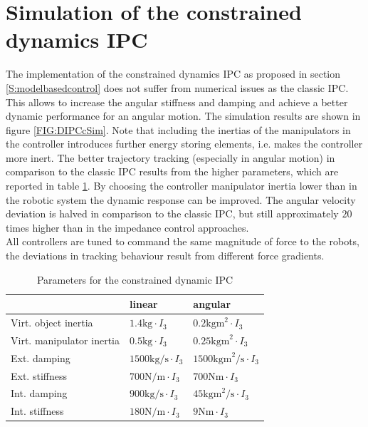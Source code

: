 \documentclass[a4paper,twoside, openright,12pt]{report}
\begin{document}
{\section{Simulation of the constrained dynamics IPC}
The implementation of the constrained dynamics IPC as proposed in section \ref{S:modelbasedcontrol} does not suffer from numerical issues as the classic IPC. This allows to increase the angular stiffness and damping and achieve a better dynamic performance for an angular motion. The simulation results are shown in figure \ref{FIG:DIPCcSim}. Note that including the inertias of the manipulators in the controller introduces further energy storing elements, i.e. makes the controller more inert. The better trajectory tracking (especially in angular motion) in comparison to the classic IPC results from the higher parameters, which are reported in table \ref{TAB:DIPCcParameters}. By choosing the controller manipulator inertia lower than in the robotic system the dynamic response can be improved. The angular velocity deviation is halved in comparison to the classic IPC, but still approximately $20$ times higher than in the impedance control approaches.\\
All controllers are tuned to command the same magnitude of force to the robots, the deviations in tracking behaviour result from different force gradients.
\begin{table}
	\centering
	\caption[Parameters for the constrained dynamic IPC]{Parameters for the constrained dynamic IPC}\vspace{10pt}
	\label{TAB:DIPCcParameters}
	
	\begin{tabular}{ l | l | l }
	 & linear & angular \\ \hline
	Virt. object inertia & $1.4 \text{kg} \cdot I_3$ & $0.2 \text{kgm}^2 \cdot I_3$ \\ \hline
	Virt. manipulator inertia & $0.5 \text{kg} \cdot I_3$ & $0.25 \text{kgm}^2 \cdot I_3$ \\ \hline 
	Ext. damping	 & $1500 \text{kg/s} \cdot I_3$ & $1500 \text{kgm}^2 \text{/s} \cdot I_3$ \\ \hline
	Ext. stiffness & $700 \text{N/m} \cdot I_3$ & $700 \text{Nm} \cdot  I_3$ \\ \hline
	Int. damping & $900 \text{kg/s} \cdot I_3$ & $45 \text{kgm}^2 \text{/s} \cdot I_3 $ \\ \hline
	Int. stiffness & $180 \text{N/m} \cdot I_3$ & $9 \text{Nm} \cdot I_3$\\ \hline
\end{tabular}
\end{table}
  
}
\end{document}
